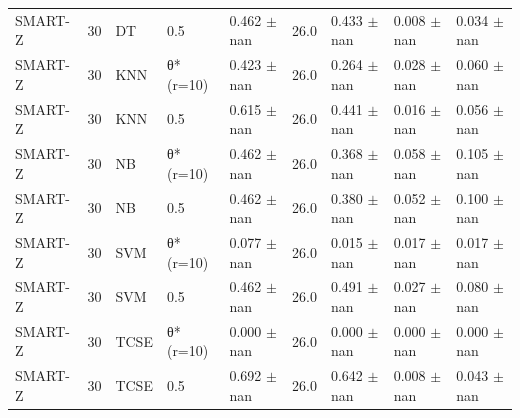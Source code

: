 \begin{table}[t]
\begin{tabular}{lllllllll}
SMART-Z & 30 & DT & 0.5 & 0.462 $\pm$ nan & 26.0 & 0.433 $\pm$ nan & 0.008 $\pm$ nan & 0.034 $\pm$ nan \\
SMART-Z & 30 & KNN & θ* (r=10) & 0.423 $\pm$ nan & 26.0 & 0.264 $\pm$ nan & 0.028 $\pm$ nan & 0.060 $\pm$ nan \\
SMART-Z & 30 & KNN & 0.5 & 0.615 $\pm$ nan & 26.0 & 0.441 $\pm$ nan & 0.016 $\pm$ nan & 0.056 $\pm$ nan \\
SMART-Z & 30 & NB & θ* (r=10) & 0.462 $\pm$ nan & 26.0 & 0.368 $\pm$ nan & 0.058 $\pm$ nan & 0.105 $\pm$ nan \\
SMART-Z & 30 & NB & 0.5 & 0.462 $\pm$ nan & 26.0 & 0.380 $\pm$ nan & 0.052 $\pm$ nan & 0.100 $\pm$ nan \\
SMART-Z & 30 & SVM & θ* (r=10) & 0.077 $\pm$ nan & 26.0 & 0.015 $\pm$ nan & 0.017 $\pm$ nan & 0.017 $\pm$ nan \\
SMART-Z & 30 & SVM & 0.5 & 0.462 $\pm$ nan & 26.0 & 0.491 $\pm$ nan & 0.027 $\pm$ nan & 0.080 $\pm$ nan \\
SMART-Z & 30 & TCSE & θ* (r=10) & 0.000 $\pm$ nan & 26.0 & 0.000 $\pm$ nan & 0.000 $\pm$ nan & 0.000 $\pm$ nan \\
SMART-Z & 30 & TCSE & 0.5 & 0.692 $\pm$ nan & 26.0 & 0.642 $\pm$ nan & 0.008 $\pm$ nan & 0.043 $\pm$ nan \\
\bottomrule
\end{tabular}
\end{table}
